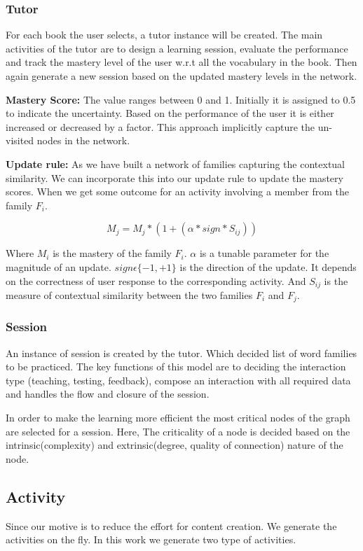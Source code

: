 \documentclass[11pt,a4paper]{article}
\begin{document}
\subsubsection{Tutor}
For each book the user selects, a tutor instance will be created. The main
activities of the tutor are to design a learning session, evaluate the
performance and track the mastery level of the user w.r.t all the vocabulary
in the book. Then again generate a new session based on the updated mastery
levels in the network.

\textbf{Mastery Score:} The value ranges between 0 and 1. Initially it is
assigned to 0.5 to indicate the uncertainty. Based on the performance of the
user it is either increased or decreased by a factor. This approach implicitly
capture the un-visited nodes in the network.

\textbf{Update rule:} As we have built a network of families capturing the
contextual similarity. We can incorporate this into our update rule to update
the mastery scores. When we get some outcome for an activity involving a member
from the family ${F_i}$.

\begin{equation}
  M_j = M_j * (1 + (\alpha * sign * S_{ij}))
\end{equation}

Where ${M_i}$ is the mastery of the family ${F_i}$. ${\alpha}$ is a tunable parameter
for the magnitude of an update. ${sign \epsilon \{-1, +1\}}$ is the direction 
of the update. It depends on the correctness of user response to the corresponding
activity. And ${S_{ij}}$ is the measure of contextual similarity between the two
families ${F_i}$ and ${F_j}$.

\subsubsection{Session}
An instance of session is created by the tutor. Which decided list of word
families to be practiced. The key functions of this model are to deciding the
interaction type (teaching, testing, feedback), compose an interaction with all
required data and handles the flow and closure of the session.

In order to make the learning more efficient the most critical nodes of the
graph are selected for a session. Here, The criticality of a node is decided
based on the intrinsic(complexity) and extrinsic(degree, quality of connection)
nature of the node.


\subsection{Activity}
Since our motive is to reduce the effort for content creation. We generate the
activities on the fly. In this work we generate two type of activities. 
\end{document}
